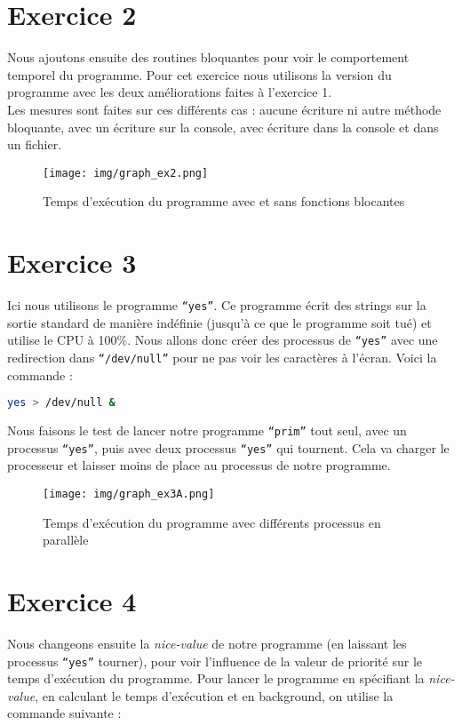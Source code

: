 \newpage

\section{Exercice 2}
Nous ajoutons ensuite des routines bloquantes pour voir le comportement temporel du programme. Pour cet exercice nous utilisons la version du programme avec les deux améliorations faites à l'exercice 1. \\

Les mesures sont faites sur ces différents cas : aucune écriture ni autre méthode bloquante, avec un écriture sur la console, avec écriture dans la console et dans un fichier.

\begin{figure}[h]
  \centering
    \texttt{[image: img/graph\_ex2.png]}
  \caption{Temps d'exécution du programme avec et sans fonctions blocantes}
  \label{graph1}
\end{figure}

\newpage

\section{Exercice 3}
Ici nous utilisons le programme \texttt{``yes''}. Ce programme écrit des strings sur la sortie standard de manière indéfinie (jusqu'à ce que le programme soit tué) et utilise le CPU à 100\%. Nous allons donc créer des processus de \texttt{``yes''} avec une redirection dans \texttt{``/dev/null''} pour ne pas voir les caractères à l'écran. Voici la commande :

\begin{lstlisting}[language=bash]
  yes > /dev/null &
\end{lstlisting}

Nous faisons le test de lancer notre programme \texttt{``prim''} tout seul, avec un processus \texttt{``yes''}, puis avec deux processus \texttt{``yes''} qui tournent. Cela va charger le processeur et laisser moins de place au processus de notre programme. 

\begin{figure}[h]
  \centering
    \texttt{[image: img/graph\_ex3A.png]}
  \caption{Temps d'exécution du programme avec différents processus en parallèle}
  \label{graph1}
\end{figure}


\newpage

\section{Exercice 4}
Nous changeons ensuite la \textit{nice-value} de notre programme (en laissant les processus \texttt{``yes''} tourner), pour voir l'influence de la valeur de priorité sur le temps d'exécution du programme. Pour lancer le programme en spécifiant la \textit{nice-value}, en calculant le temps d'exécution et en background, on utilise la commande suivante :

